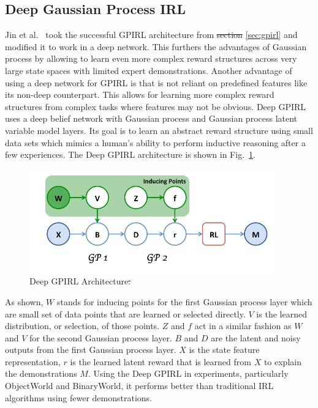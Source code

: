 \documentclass[12pt,american]{report}
\providecommand{\DIFaddtex}[1]{{\protect\color{blue}\uwave{#1}}} %
\providecommand{\DIFdeltex}[1]{{\protect\color{red}\sout{#1}}}                      %
\providecommand{\DIFaddbegin}{} %
\providecommand{\DIFaddend}{} %
\providecommand{\DIFdelbegin}{} %
\providecommand{\DIFdelend}{} %
\providecommand{\DIFaddFL}[1]{\DIFadd{#1}} %
\providecommand{\DIFdelFL}[1]{\DIFdel{#1}} %
\providecommand{\DIFaddbeginFL}{} %
\providecommand{\DIFaddendFL}{} %
\providecommand{\DIFdelbeginFL}{} %
\providecommand{\DIFdelendFL}{} %
\providecommand{\DIFadd}[1]{\texorpdfstring{\DIFaddtex{#1}}{#1}} %
\providecommand{\DIFdel}[1]{\texorpdfstring{\DIFdeltex{#1}}{}} %
\newcommand{\DIFscaledelfig}{0.5}
\newlength{\DIFdelgraphicswidth} %
\newlength{\DIFdelgraphicsheight} %
\newcommand{\DIFaddincludegraphics}[2][]{{\color{blue}\fbox{\DIFOincludegraphics[#1]{#2}}}} %
\newcommand{\DIFdelincludegraphics}[2][]{%
\sbox{\DIFdelgraphicsbox}{\DIFOincludegraphics[#1]{#2}}%
\settoboxwidth{\DIFdelgraphicswidth}{\DIFdelgraphicsbox} %
\settoboxtotalheight{\DIFdelgraphicsheight}{\DIFdelgraphicsbox} %
\scalebox{\DIFscaledelfig}{%
\parbox[b]{\DIFdelgraphicswidth}{\usebox{\DIFdelgraphicsbox}\\[-\baselineskip] \rule{\DIFdelgraphicswidth}{0em}}\llap{\resizebox{\DIFdelgraphicswidth}{\DIFdelgraphicsheight}{%
\setlength{\unitlength}{\DIFdelgraphicswidth}%
\begin{picture}(1,1)%
\thicklines\linethickness{2pt} %
{\color[rgb]{1,0,0}\put(0,0){\framebox(1,1){}}}%
{\color[rgb]{1,0,0}\put(0,0){\line( 1,1){1}}}%
{\color[rgb]{1,0,0}\put(0,1){\line(1,-1){1}}}%
\end{picture}%
}\hspace*{3pt}}} %
} %
\DeclareRobustCommand{\DIFaddbegin}{\DIFOaddbegin \let\includegraphics\DIFaddincludegraphics} %
\DeclareRobustCommand{\DIFaddend}{\DIFOaddend \let\includegraphics\DIFOincludegraphics} %
\DeclareRobustCommand{\DIFdelbegin}{\DIFOdelbegin \let\includegraphics\DIFdelincludegraphics} %
\DeclareRobustCommand{\DIFdelend}{\DIFOaddend \let\includegraphics\DIFOincludegraphics} %
\DeclareRobustCommand{\DIFaddbeginFL}{\DIFOaddbeginFL \let\includegraphics\DIFaddincludegraphics} %
\DeclareRobustCommand{\DIFaddendFL}{\DIFOaddendFL \let\includegraphics\DIFOincludegraphics} %
\DeclareRobustCommand{\DIFdelbeginFL}{\DIFOdelbeginFL \let\includegraphics\DIFdelincludegraphics} %
\DeclareRobustCommand{\DIFdelendFL}{\DIFOaddendFL \let\includegraphics\DIFOincludegraphics} %
\begin{document}
\subsection{Deep Gaussian Process IRL}
Jin et al.~\cite{jin2015inverse} took the successful GPIRL architecture from \DIFdelbegin \DIFdel{section }\DIFdelend \DIFaddbegin \DIFadd{Section }\DIFaddend \ref{sec:gpirl} and modified it to work in a deep network. This furthers the advantages of Gaussian process by allowing to learn even more complex reward structures across very large state spaces with limited expert demonstrations. Another advantage of using a deep network for GPIRL is that is not reliant on predefined features like its non-deep counterpart.  This allows for learning more complex reward structures from complex tasks where features may not be obvious.  Deep GPIRL uses a deep belief network with Gaussian process and Gaussian process latent variable model layers. Its goal is to learn an abstract reward structure using small data sets which mimics a human's ability to perform inductive reasoning after a few experiences. The Deep GPIRL architecture is shown in Fig.~\ref{fig:dgpirl-arch}.
\begin{figure}
\centering
\includegraphics[scale=1.5]{images/dgpirl-arch.png}
\caption{Deep GPIRL Architecture\DIFdelbeginFL \DIFdelFL{.}\DIFdelendFL ~\cite{jin2015inverse}\DIFaddbeginFL \DIFaddFL{.}\DIFaddendFL }
\label{fig:dgpirl-arch}
\end{figure}
 As shown, $W$ stands for inducing points for the first Gaussian process layer which are small set of data points that are learned or selected directly. $V$ is the learned distribution, or selection, of those points.  $Z$ and $f$ act in a similar fashion as $W$ and $V$ for the second Gaussian process layer. $B$ and $D$ are the latent and noisy outputs from the first Gaussian process layer. $X$ is the state feature representation, $r$ is the learned latent reward that is learned from $X$ to explain the demonstrations $M$.  Using the Deep GPIRL in experiments, particularly ObjectWorld and BinaryWorld, it performs better than traditional IRL algorithms using fewer demonstrations. 
\end{document}
